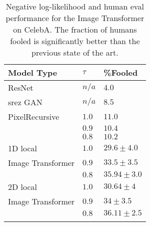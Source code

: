 
\begin{table}[h!]
\caption{Negative log-likelihood and human eval performance for the Image Transformer on CelebA. The fraction of humans fooled is significantly better than the previous state of the art.}
\label{tab:superres_table}
\begin{center}
\vspace{2mm}
\begin{tabular}{lll}
Model Type  & $\tau$ & \%Fooled  \\
\hline
ResNet  & $n/a$ & $4.0$  \\
srez GAN  & $n/a$ & $8.5$  \\
\hline
PixelRecursive & $1.0$  & $11.0$  \\
\citep{PixelRecursiveSuperResolution} & $0.9$  & $10.4$  \\
& $0.8$  & $10.2$ \\
\hline
1D local & $1.0$  & $29.6\pm4.0$ \\
Image Transformer & $0.9$ & $33.5\pm3.5$ \\
& $0.8$ &  $\mathbf{35.94\pm3.0}$ \\
\hline
2D local & $1.0$ & $30.64\pm4$ \\
Image Transformer& $0.9$ & $34\pm3.5$  \\
& $0.8$ &  $\mathbf{36.11\pm2.5}$ \\
\bottomrule
\label{tab:CelebASuperResolution}
\end{tabular}

\end{center}
\end{table}








